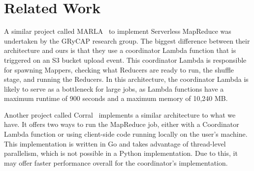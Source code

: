 \section{Related Work}
\label{sec:related_work}

A similar project called MARLA~\cite{marla} to implement Serverless MapReduce was undertaken by the GRyCAP research group. The biggest difference between their architecture and ours is that they use a coordinator Lambda function that is triggered on an S3 bucket upload event. This coordinator Lambda is responsible for spawning Mappers, checking what Reducers are ready to run, the shuffle stage, and running the Reducers. In this architecture, the coordinator Lambda is likely to serve as a bottleneck for large jobs, as Lambda functions have a maximum runtime of 900 seconds and a maximum memory of 10,240 MB.

Another project called  Corral~\cite{corral} implements a similar architecture to what we have. It offers two ways to run the MapReduce job, either with a Coordinator Lambda function or using client-side code running locally on the user's machine. This implementation is written in Go and takes advantage of thread-level parallelism, which is not possible in a Python implementation. Due to this, it may offer faster performance overall for the coordinator's implementation.